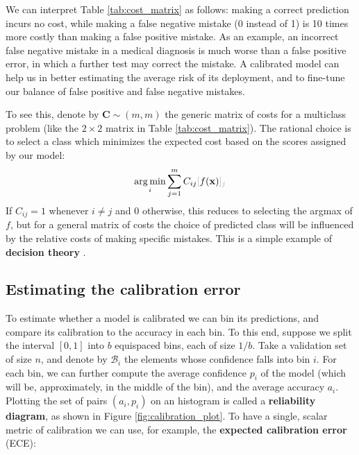 We can interpret Table \ref{tab:cost_matrix} as follows: making a correct prediction incurs no cost, while making a false negative mistake (0 instead of 1) is 10 times more costly than making a false positive mistake. As an example, an incorrect false negative mistake in a medical diagnosis is much worse than a false positive error, in which a further test may correct the mistake. A calibrated model can help us in better estimating the average risk of its deployment, and to fine-tune our balance of false positive and false negative mistakes.

To see this, denote by $\mathbf{C} \sim (m, m)$ the generic matrix of costs for a multiclass problem (like the $2\times2$ matrix in Table \ref{tab:cost_matrix}). The rational choice is to select a class which minimizes the expected cost based on the scores assigned by our model:
%
$$
\underset{i}{\arg\min} \sum_{j=1}^m C_{ij} \idx{f(\mathbf{x})}{j}
$$
%
If $C_{ij} = 1$ whenever $i \neq j$ and $0$ otherwise, this reduces to selecting the argmax of $f$, but for a general matrix of costs the choice of predicted class will be influenced by the relative costs of  making specific mistakes. This is a simple example of \textbf{decision theory} \cite{bishop2006pattern}.

\subsection{Estimating the calibration error}

To estimate whether a model is calibrated we can bin its predictions, and compare its calibration to the accuracy in each bin. To this end, suppose we split the interval $[0,1]$ into $b$ equispaced bins, each of size $1/b$. Take a validation set of size $n$, and denote by $\mathcal{B}_i$ the elements whose confidence falls into bin $i$. For each bin, we can further compute the average confidence $p_i$ of the model (which will be, approximately, in the middle of the bin), and the average accuracy $a_i$. Plotting the set of pairs $(a_i, p_i)$ on an histogram is called a \textbf{reliability diagram}, as shown in Figure \ref{fig:calibration_plot}. To have a single, scalar metric of calibration we can use, for example, the \textbf{expected calibration error} (ECE):

